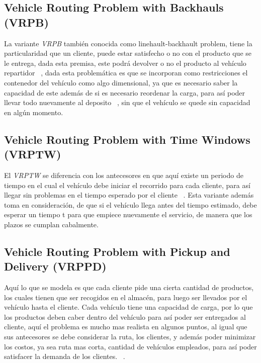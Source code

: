 \documentclass[letter, 10pt]{article}
\begin{document}
\subsection{Vehicle Routing Problem with Backhauls (VRPB)}

La variante \emph{VRPB} tambi\'en conocida como linehault-backhault problem, tiene la particularidad que un cliente, puede estar satisfecho o no
con el producto que se le entrega, dada esta premisa, este podr\'a devolver o no el producto al veh\'iculo repartidor ~\cite{Prosser93Hybrid}, 
dada esta problem\'atica
es que se incorporan como restricciones el contenedor del veh\'iculo como algo dimensional, ya que es necesario saber la capacidad 
de este adem\'as 
de si es necesario reordenar la carga, para as\'i poder llevar todo nuevamente al deposito ~\cite{Prosser93Hybrid}, sin que el veh\'iculo se quede sin capacidad en alg\'un 
momento.

\subsection{Vehicle Routing Problem with Time Windows (VRPTW)}

El \emph{VRPTW} se diferencia con los antecesores en que aqu\'i existe un periodo de tiempo en el cual el veh\'iculo debe iniciar el recorrido para
cada cliente, para as\'i llegar sin problemas en el tiempo esperado por el cliente ~\cite{journals/eor/AziGP07}.
Esta variante adem\'as toma en consideraci\'on, de que si el veh\'iculo llega antes del tiempo estimado, debe esperar un tiempo t para que empiece
nuevamente el servicio, de manera que los plazos se cumplan cabalmente.

\subsection{Vehicle Routing Problem with Pickup and Delivery (VRPPD)}

Aqu\'i lo que se modela es que cada cliente pide una cierta cantidad de productos, los cuales tienen que ser recogidos en el almac\'en, para luego ser
llevados por el veh\'iculo hasta el cliente. Cada veh\'iculo tiene una capacidad de carga, por lo que los productos deben caber dentro del veh\'iculo
para as\'i poder ser entregados al cliente, aqu\'i el problema es mucho mas realista en algunos puntos, al igual que sus antecesores se debe considerar 
la ruta, los clientes, y adem\'as poder minimizar los costos, ya sea ruta mas corta, cantidad de veh\'iculos empleados, para as\'i poder satisfacer 
la demanda de los clientes.
~\cite{EilamTzoreff2002193}.
\end{document}
